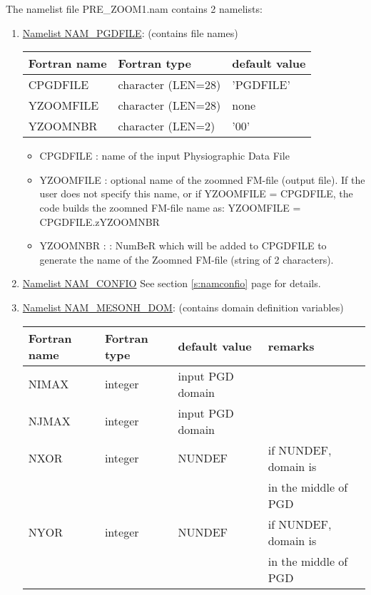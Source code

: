 The namelist file PRE\_ZOOM1.nam contains 2 namelists:
\begin{enumerate}
\item
\underline{Namelist NAM\_PGDFILE}: (contains file names)

\begin{center}
\begin{tabular} {|l|l|l|}
\hline
Fortran name & Fortran type & default value\\
\hline
\hline
CPGDFILE      & character (LEN=28) & 'PGDFILE'      \\
YZOOMFILE     & character (LEN=28) & none           \\
YZOOMNBR      & character (LEN=2)  & '00'           \\
\hline
\end{tabular}
\end{center}

\begin{itemize}
\item CPGDFILE : name of the input Physiographic Data File
\item YZOOMFILE : optional name of the zoomned FM-file (output file).
If the user does not specify this name,
or if YZOOMFILE = CPGDFILE, the code builds the zoomned FM-file name as:
\subitem YZOOMFILE = CPGDFILE.zYZOOMNBR
\item YZOOMNBR :
 :
NumBeR which will be added to CPGDFILE to generate the  
name of the Zoomned FM-file (string of 2 characters).
\end{itemize}
\item
\underline{Namelist NAM\_CONFIO}
See section \ref{s:namconfio} page \pageref{s:namconfio} for details.
\item
\underline{Namelist NAM\_MESONH\_DOM}: (contains domain definition variables)

\begin{center}
\begin{tabular} {|l|l|l|l|}
\hline
Fortran name & Fortran type & default value & remarks \\
\hline
\hline
NIMAX & integer & input PGD domain & \\
NJMAX & integer & input PGD domain & \\
NXOR  & integer & NUNDEF & if NUNDEF, domain is \\ 
      &         &        & in the middle of PGD \\ 
NYOR  & integer & NUNDEF & if NUNDEF, domain is \\ 
      &         &        & in the middle of PGD \\ 
\hline
\end{tabular}
\end{center}


\end{enumerate}
